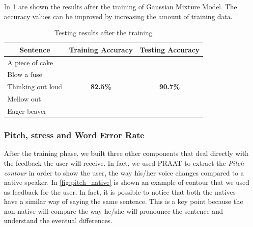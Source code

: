 \noindent In \ref{table:accuracy} are shown the results after the training of Gaussian Mixture Model. The accuracy values can be improved by increasing the amount of training data.

\begin{table}[!ht]
	\centering
	\caption{Testing results after the training}
	\label{table:accuracy}
	\begin{tabular}{|l|c|c|}
		\hline
		\multicolumn{1}{|c|}{\textbf{Sentence}} & \textbf{Training Accuracy}       & \textbf{Testing Accuracy}        \\ \hline
		A piece of cake                         & 								   & 
		\\ \cline{1-1}
		Blow a fuse                             &                                  &                                  \\ \cline{1-1}
		Thinking out loud                       &  \textbf{82.5\%}                 & \textbf{90.7\%}   
		\\ \cline{1-1}
		Mellow out                              &                                  &                                  \\ \cline{1-1}
		Eager beaver                            &                                  &                                  \\ \hline
	\end{tabular}
\end{table} 

\subsubsection{Pitch, stress and Word Error Rate}
\noindent After the training phase, we built three other components that deal directly with the feedback the user will receive. In fact, we used PRAAT to extract the \textit{Pitch contour} in order to show the user, the way his/her voice changes compared to a native speaker. In \ref{fig:pitch_native} is shown an example of contour that we used as feedback for the user. In fact, it is possible to notice that both the natives have a similar way of saying the same sentence. This is a key point because the non-native will compare the way he/she will pronounce the sentence and understand the eventual differences. \\

